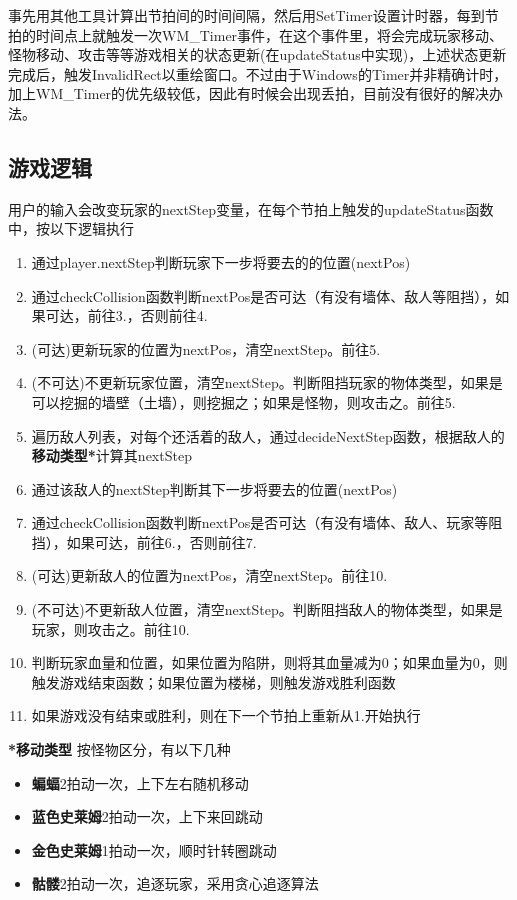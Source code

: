 \documentclass[11pt,a4paper]{article}	%
\begin{document}
事先用其他工具计算出节拍间的时间间隔，然后用SetTimer设置计时器，每到节拍的时间点上就触发一次WM\_Timer事件，在这个事件里，将会完成玩家移动、怪物移动、攻击等等游戏相关的状态更新(在updateStatus中实现)，上述状态更新完成后，触发InvalidRect以重绘窗口。不过由于Windows的Timer并非精确计时，加上WM\_Timer的优先级较低，因此有时候会出现丢拍，目前没有很好的解决办法。
\subsection{游戏逻辑}
用户的输入会改变玩家的nextStep变量，在每个节拍上触发的updateStatus函数中，按以下逻辑执行
\begin{enumerate}
	\item 通过player.nextStep判断玩家下一步将要去的的位置(nextPos)
	\item 通过checkCollision函数判断nextPos是否可达（有没有墙体、敌人等阻挡），如果可达，前往3.，否则前往4.
	\item (可达)更新玩家的位置为nextPos，清空nextStep。前往5.
	\item (不可达)不更新玩家位置，清空nextStep。判断阻挡玩家的物体类型，如果是可以挖掘的墙壁（土墙），则挖掘之；如果是怪物，则攻击之。前往5.
	\item 遍历敌人列表，对每个还活着的敌人，通过decideNextStep函数，根据敌人的\textbf{移动类型*}计算其nextStep
	\item 通过该敌人的nextStep判断其下一步将要去的位置(nextPos)
	\item 通过checkCollision函数判断nextPos是否可达（有没有墙体、敌人、玩家等阻挡），如果可达，前往6.，否则前往7.
	\item (可达)更新敌人的位置为nextPos，清空nextStep。前往10.
	\item (不可达)不更新敌人位置，清空nextStep。判断阻挡敌人的物体类型，如果是玩家，则攻击之。前往10.
	\item 判断玩家血量和位置，如果位置为陷阱，则将其血量减为0；如果血量为0，则触发游戏结束函数；如果位置为楼梯，则触发游戏胜利函数
	\item 如果游戏没有结束或胜利，则在下一个节拍上重新从1.开始执行
\end{enumerate}
\textbf{*移动类型} \quad 按怪物区分，有以下几种
\begin{itemize}
	\item \textbf{蝙蝠}\quad 2拍动一次，上下左右随机移动
	\item \textbf{蓝色史莱姆}\quad 2拍动一次，上下来回跳动
	\item \textbf{金色史莱姆}\quad 1拍动一次，顺时针转圈跳动
	\item \textbf{骷髅}\quad 2拍动一次，追逐玩家，采用贪心追逐算法
\end{itemize}
\end{document}

